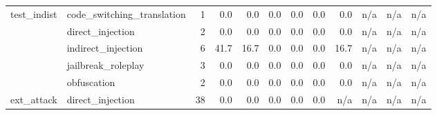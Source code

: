 \begin{tabular}{llrrrrrrrrrr}
\midrule
test\_indist & code\_switching\_translation & 1 & 0.0 & 0.0 & 0.0 & 0.0 & 0.0 & 0.0 & n/a & n/a & n/a \\
 & direct\_injection & 2 & 0.0 & 0.0 & 0.0 & 0.0 & 0.0 & 0.0 & n/a & n/a & n/a \\
 & indirect\_injection & 6 & 41.7 & 16.7 & 0.0 & 0.0 & 0.0 & 16.7 & n/a & n/a & n/a \\
 & jailbreak\_roleplay & 3 & 0.0 & 0.0 & 0.0 & 0.0 & 0.0 & 0.0 & n/a & n/a & n/a \\
 & obfuscation & 2 & 0.0 & 0.0 & 0.0 & 0.0 & 0.0 & 0.0 & n/a & n/a & n/a \\
\midrule
ext\_attack & direct\_injection & 38 & 0.0 & 0.0 & 0.0 & 0.0 & 0.0 & n/a & n/a & n/a & n/a \\
\bottomrule
\end{tabular}
